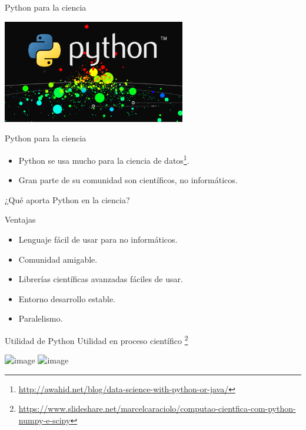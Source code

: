 \documentclass[bigger,unknownkeysallowed]{beamer}
\begin{document}
\begin{frame}[label={sec:orga7ba136}]{Python para la ciencia}
\begin{center}
\begin{center}
\includegraphics[width=0.6\textwidth]{python_science.png}
\end{center}
\end{center}

\begin{block}{Python para la ciencia}
\begin{itemize}
\item Python se usa mucho para la ciencia de datos\footnote{\url{http://awahid.net/blog/data-science-with-python-or-java/}}.

\item Gran parte de su comunidad son científicos, no informáticos.
\end{itemize}
\end{block}
\end{frame}


\begin{frame}[label={sec:orgc96da70}]{¿Qué aporta Python en la ciencia?}
\begin{block}{Ventajas}
\begin{itemize}
\item Lenguaje fácil de usar para no informáticos.

\item Comunidad amigable.

\item Librerías científicas avanzadas fáciles de usar.

\item Entorno desarrollo estable.

\item Paralelismo.
\end{itemize}
\end{block}
\end{frame}

\begin{frame}[label={sec:orgc030f8b}]{Utilidad de Python}
Utilidad en proceso científico \footnote{\url{https://www.slideshare.net/marcelcaraciolo/computao-cientfica-com-python-numpy-e-scipy}\label{org71116df}} 
\begin{center}
\includegraphics<1>[width=.6\textwidth]{fases.png}
\includegraphics<2>[width=.6\textwidth]{python_fases.png}
\end{center}
\end{frame}
\end{document}
